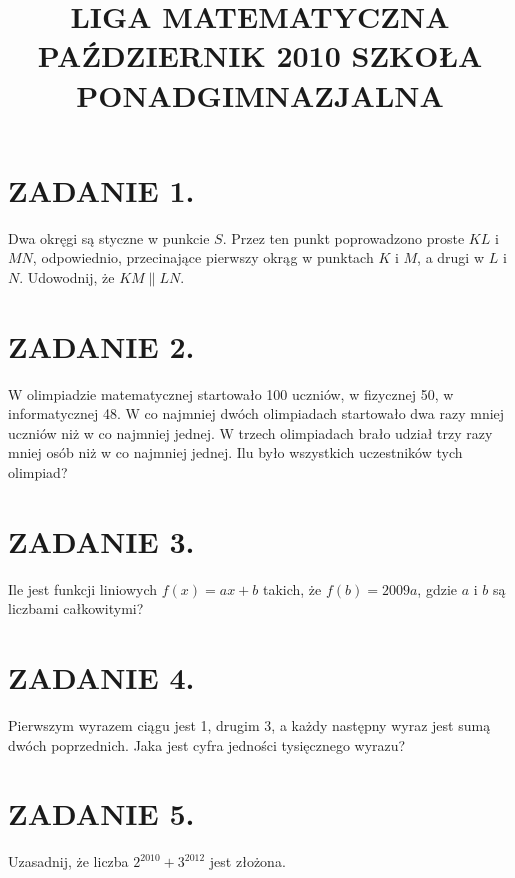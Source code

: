 \documentclass[10pt]{article}
\title{LIGA MATEMATYCZNA \\
 PAŹDZIERNIK 2010 SZKOŁA PONADGIMNAZJALNA }
\author{}
\date{}
\begin{document}
\maketitle
\section*{ZADANIE 1.}
Dwa okręgi są styczne w punkcie \(S\). Przez ten punkt poprowadzono proste \(K L\) i \(M N\), odpowiednio, przecinające pierwszy okrąg w punktach \(K\) i \(M\), a drugi w \(L\) i \(N\). Udowodnij, że \(K M \| L N\).

\section*{ZADANIE 2.}
W olimpiadzie matematycznej startowało 100 uczniów, w fizycznej 50, w informatycznej 48. W co najmniej dwóch olimpiadach startowało dwa razy mniej uczniów niż w co najmniej jednej. W trzech olimpiadach brało udział trzy razy mniej osób niż w co najmniej jednej. Ilu było wszystkich uczestników tych olimpiad?

\section*{ZADANIE 3.}
Ile jest funkcji liniowych \(f(x)=a x+b\) takich, że \(f(b)=2009 a\), gdzie \(a\) i \(b\) są liczbami całkowitymi?

\section*{ZADANIE 4.}
Pierwszym wyrazem ciągu jest 1, drugim 3, a każdy następny wyraz jest sumą dwóch poprzednich. Jaka jest cyfra jedności tysięcznego wyrazu?

\section*{ZADANIE 5.}
Uzasadnij, że liczba \(2^{2010}+3^{2012}\) jest złożona.
\end{document}
